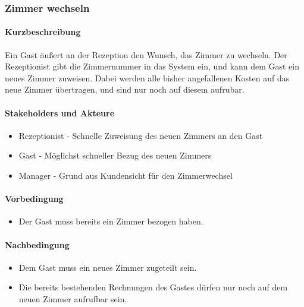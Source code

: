 \subsubsection{Zimmer wechseln}
\label{UseCase_ZimmerWechseln}

\paragraph{Kurzbeschreibung}
Ein \Gls{Gast} äußert an der \Gls{Rezeption} den Wunsch, das \Gls{Zimmer} zu wechseln. Der \Gls{Rezeptionist} gibt die \Gls{Zimmernummer} in das System ein, und kann dem \Gls{Gast} ein neues \Gls{Zimmer} zuweisen. Dabei werden alle bisher angefallenen Kosten auf das neue \Gls{Zimmer} übertragen, und sind nur noch auf diesem aufrubar.

\paragraph{Stakeholders und Akteure}
\begin{itemize}
	\item Rezeptionist - Schnelle Zuweisung des neuen \Gls{Zimmer}s an den \Gls{Gast}
	\item Gast - Möglichst schneller Bezug des neuen \Gls{Zimmer}s
	\item Manager - Grund aus Kundensicht für den \Gls{Zimmer}wechsel
\end{itemize}

\paragraph{Vorbedingung}
\begin{itemize}
	\item Der \Gls{Gast} muss bereits ein \Gls{Zimmer} bezogen haben.
\end{itemize}

\paragraph{Nachbedingung}
\begin{itemize}
	\item Dem \Gls{Gast} muss ein neues Zimmer zugeteilt sein.
	\item Die bereits bestehenden Rechnungen des \Gls{Gast}es dürfen nur noch auf dem neuen \Gls{Zimmer} aufrufbar sein.
\end{itemize}

